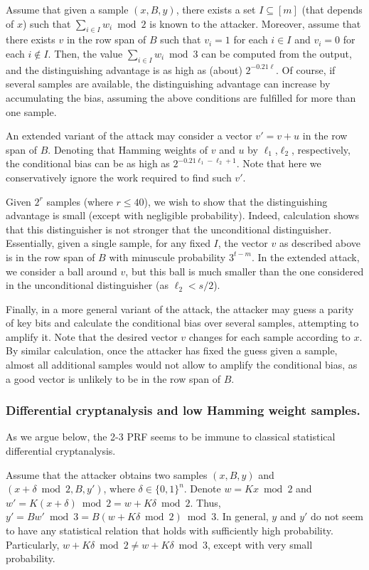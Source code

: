 \documentclass[orivec,envcountsect]{llncs}
\begin{document}
Assume that given a sample $(x,B,y)$,
there exists a set $I \subseteq [m]$ (that depends of $x$)
such that $\sum_{i \in I} w_i \bmod 2$ is known to the attacker.
Moreover, assume that there exists $v$ in the row span of $B$
such that $v_i = 1$ for each $i \in I$ and $v_i = 0$
for each $i \notin I$.
Then, the value $\sum_{i \in I} w_i \bmod 3$ can be computed from
the output, and the distinguishing advantage is as high as (about) $2^{-0.21\ell}$.
Of course, if several samples are available, the distinguishing advantage can
increase by accumulating the bias,
assuming the above conditions are fulfilled for more than one sample.

An extended variant of the attack may consider a vector
$v' = v + u$ in the row span of $B$.
Denoting that Hamming weights of $v$ and $u$ by $\ell_1$,$\ell_2$, respectively,
the conditional bias can be as high as $2^{-0.21\ell_1 - \ell_2 + 1}$.
Note that here we conservatively ignore the work required to find such $v'$.

Given $2^r$ samples (where $r \leq 40$),
we wish to show that the distinguishing advantage is small
(except with negligible probability).
Indeed, calculation shows that this distinguisher is not stronger that the
unconditional distinguisher.
Essentially, given a single sample, for any fixed $I$, the vector $v$ as described above
is in the row span of $B$ with minuscule probability $3^{t - m}$.
In the extended attack, we consider a ball around $v$, but this ball
is much smaller than the one considered in the unconditional distinguisher (as $\ell_2 < s/2$).

Finally, in a more general variant of the attack,
the attacker may guess a parity of key bits and calculate the conditional bias over several samples,
attempting to amplify it.
Note that the desired vector $v$ changes for each sample according to $x$.
By similar calculation, once the attacker has fixed the guess given a sample,
almost all additional samples would not allow to amplify the conditional bias,
as a good vector is unlikely to be in the row span of $B$.

\subsubsection{Differential cryptanalysis and low Hamming weight samples.}
As we argue below, the 2-3 PRF seems to be immune to classical statistical differential cryptanalysis.

Assume that the attacker obtains two samples $(x,B,y)$ and $(x+\delta \bmod 2,B,y')$, where $\delta \in \{0,1\}^n$.
Denote $w = K x \bmod 2$ and $w' = K (x + \delta) \bmod 2 = w + K \delta \bmod 2$.
Thus, $y' = B w' \bmod 3 = B (w + K \delta \bmod 2 ) \bmod 3$.
In general, $y$ and $y'$ do not seem to have any statistical relation that holds with sufficiently high probability.
Particularly, $w + K \delta \bmod 2 \neq w + K \delta \bmod 3$,
except with very small probability.
\end{document}
